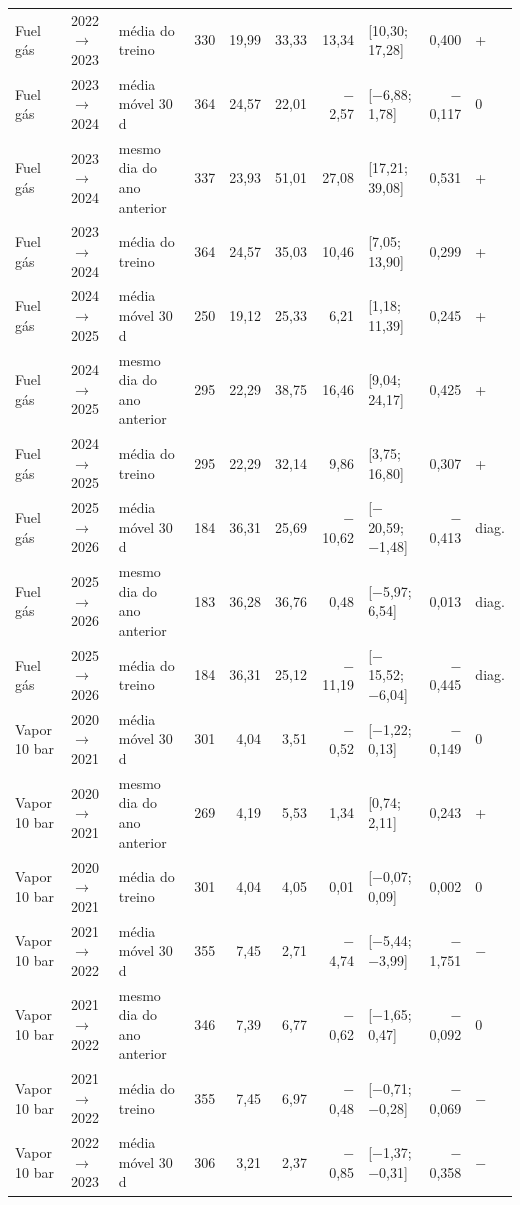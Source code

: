 {\begin{xltabular}{\linewidth}{@{}llp{2.4cm}rrrrlrl@{}}
Fuel gás & 2022$\to$2023 & média do treino & 330 & 19,99 & 33,33 & 13,34 & [10,30; 17,28] & 0,400 & + \\
Fuel gás & 2023$\to$2024 & média móvel 30 d & 364 & 24,57 & 22,01 & $-$2,57 & [$-$6,88; 1,78] & $-$0,117 & 0 \\
Fuel gás & 2023$\to$2024 & mesmo dia do ano anterior & 337 & 23,93 & 51,01 & 27,08 & [17,21; 39,08] & 0,531 & + \\
Fuel gás & 2023$\to$2024 & média do treino & 364 & 24,57 & 35,03 & 10,46 & [7,05; 13,90] & 0,299 & + \\
Fuel gás & 2024$\to$2025 & média móvel 30 d & 250 & 19,12 & 25,33 & 6,21 & [1,18; 11,39] & 0,245 & + \\
Fuel gás & 2024$\to$2025 & mesmo dia do ano anterior & 295 & 22,29 & 38,75 & 16,46 & [9,04; 24,17] & 0,425 & + \\
Fuel gás & 2024$\to$2025 & média do treino & 295 & 22,29 & 32,14 & 9,86 & [3,75; 16,80] & 0,307 & + \\
Fuel gás & 2025$\to$2026 & média móvel 30 d & 184 & 36,31 & 25,69 & $-$10,62 & [$-$20,59; $-$1,48] & $-$0,413 & diag. \\
Fuel gás & 2025$\to$2026 & mesmo dia do ano anterior & 183 & 36,28 & 36,76 & 0,48 & [$-$5,97; 6,54] & 0,013 & diag. \\
Fuel gás & 2025$\to$2026 & média do treino & 184 & 36,31 & 25,12 & $-$11,19 & [$-$15,52; $-$6,04] & $-$0,445 & diag. \\
Vapor 10 bar & 2020$\to$2021 & média móvel 30 d & 301 & 4,04 & 3,51 & $-$0,52 & [$-$1,22; 0,13] & $-$0,149 & 0 \\
Vapor 10 bar & 2020$\to$2021 & mesmo dia do ano anterior & 269 & 4,19 & 5,53 & 1,34 & [0,74; 2,11] & 0,243 & + \\
Vapor 10 bar & 2020$\to$2021 & média do treino & 301 & 4,04 & 4,05 & 0,01 & [$-$0,07; 0,09] & 0,002 & 0 \\
Vapor 10 bar & 2021$\to$2022 & média móvel 30 d & 355 & 7,45 & 2,71 & $-$4,74 & [$-$5,44; $-$3,99] & $-$1,751 & $-$ \\
Vapor 10 bar & 2021$\to$2022 & mesmo dia do ano anterior & 346 & 7,39 & 6,77 & $-$0,62 & [$-$1,65; 0,47] & $-$0,092 & 0 \\
Vapor 10 bar & 2021$\to$2022 & média do treino & 355 & 7,45 & 6,97 & $-$0,48 & [$-$0,71; $-$0,28] & $-$0,069 & $-$ \\
Vapor 10 bar & 2022$\to$2023 & média móvel 30 d & 306 & 3,21 & 2,37 & $-$0,85 & [$-$1,37; $-$0,31] & $-$0,358 & $-$ \\

\end{xltabular}}
